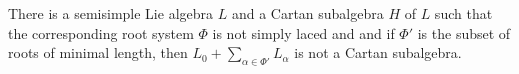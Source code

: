 There is a semisimple Lie algebra $L$ and a Cartan subalgebra $H$ of $L$ such
that the corresponding root system $\Phi$ is not simply laced and and if
$\Phi'$ is the subset of roots of minimal length, then
$L_0 + \sum_{\alpha \in \Phi'} L_\alpha$ is not a Cartan subalgebra.
